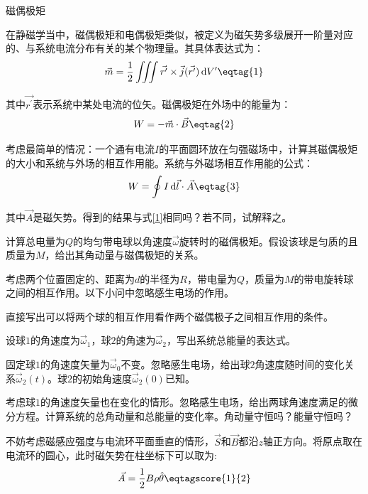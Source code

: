 \documentclass[answer]{cphos}
\begin{document}
\begin{problem}[50]{磁偶极矩}

\begin{problemstatement}
在静磁学当中，磁偶极矩和电偶极矩类似，被定义为磁矢势多级展开一阶量对应的、与系统电流分布有关的某个物理量。其具体表达式为：
\begin{equation}
	\vec{m}=\frac{1}{2}\iiint\vec{r^\prime}\times\vec{j}(\vec{r^\prime})\,\mathrm{d}V^\prime\eqtag{1} 
\end{equation}

其中\(\vec{r^\prime}\)表示系统中某处电流的位矢。磁偶极矩在外场中的能量为：
\begin{equation}
	W=-\vec{m}\cdot\vec{B}\eqtag{2}\label{1}
\end{equation}

考虑最简单的情况：一个通有电流\(I\)的平面圆环放在匀强磁场中，计算其磁偶极矩的大小和系统与外场的相互作用能。系统与外磁场相互作用能的公式：
\begin{equation}
	W=\oint I\,\mathrm{d}\vec{l}\cdot\vec{A}\eqtag{3}
\end{equation}

其中\(\vec{A}\)是磁矢势。得到的结果与式\ref{1}相同吗？若不同，试解释之。

计算总电量为\(Q\)的均匀带电球以角速度\(\vec{\omega}\)旋转时的磁偶极矩。假设该球是匀质的且质量为\(M\)，给出其角动量与磁偶极矩的关系。

考虑两个位置固定的、距离为\(d\)的半径为\(R\)，带电量为\(Q\)，质量为\(M\)的带电旋转球之间的相互作用。以下小问中忽略感生电场的作用。

直接写出可以将两个球的相互作用看作两个磁偶极子之间相互作用的条件。

设球\(1\)的角速度为\(\vec{\omega}_1\)，球\(2\)的角速为\(\vec{\omega}_2\)，写出系统总能量的表达式。

固定球\(1\)的角速度矢量为\(\vec{\omega}_0\)不变。忽略感生电场，给出球\(2\)角速度随时间的变化关系\(\vec{\omega}_2(t)\)。球\(2\)的初始角速度\(\vec{\omega}_2(0)\)已知。

考虑球\(1\)的角速度矢量也在变化的情形。忽略感生电场，给出两球角速度满足的微分方程。计算系统的总角动量和总能量的变化率。角动量守恒吗？能量守恒吗？

\end{problemstatement}

\begin{solution}
不妨考虑磁感应强度与电流环平面垂直的情形，\(\vec{S}\)和\(\vec{B}\)都沿\(z\)轴正方向。将原点取在电流环的圆心，此时磁矢势在柱坐标下可以取为:
\begin{equation}
	\vec{A}=\frac{1}{2}B\rho\hat{\theta}\eqtagscore{1}{2}
\end{equation}


\end{solution}
\end{problem}
\end{document}
